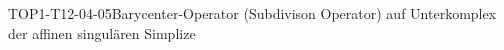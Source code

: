 
\begin{DEF}{TOP1-T12-04-05}{Barycenter-Operator (Subdivison Operator) auf Unterkomplex der affinen singulären Simplize}
\end{DEF}
